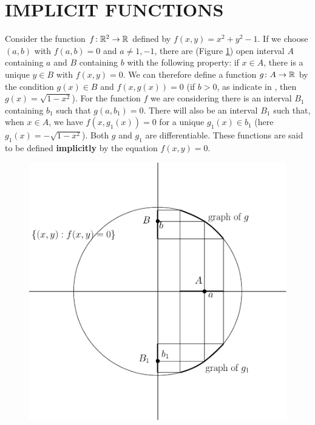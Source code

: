 \clearpage
\section[\textsc{implicit functions}]{IMPLICIT FUNCTIONS}
Consider the function $f\colon{}\mathbb{R}^2\to \mathbb{R}$ defined by $f(x, y) = x^2 + y^2 -1$. If 
we choose $(a, b)$ with $f(a, b) = 0$ and $a\neq 1, -1$, there are  (Figure \ref{Fig 2-4}) open 
interval $A$ containing $a$ and $B$ containing $b$ with the following property:
if $x\in A$, there is a unique $y\in B$ with $f(x, y) = 0$. We can therefore define 
a function $g\colon{}A\to \mathbb{R}$ by the condition $g(x)\in B$ and $f(x, g(x)) = 0$ (if $b>0$,
as indicate in , then $g(x) = \sqrt{1-x^2}$). For the function $f$ we are considering
there is an interval $B_1$ containing $b_1$ such that $g(a, b_1)=0$. There will also be 
an interval $B_1$ such that, when $x\in A$, we have $f(x, g_1(x)) = 0$ for a unique $g_1(x)\in b_1$ 
(here $g_1(x) = -\sqrt{1-x^2}$). Both $g$ and $g_1$ are differentiable. These functions are 
said to be defined \textbf{implicitly}%
 by the equation $f(x, y) = 0$.

\begin{figure}[!htb]
  \centering
  \includegraphics[width=.75\linewidth]{./pics/Fig2-4.pdf}
  \caption{}
  \label{Fig 2-4}
\end{figure}


